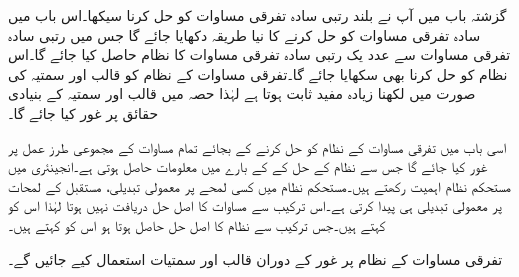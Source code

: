 گزشتہ باب میں آپ نے بلند رتبی سادہ تفرقی مساوات کو حل کرنا سیکھا۔اس باب میں سادہ تفرقی مساوات کو حل کرنے کا نیا طریقہ دکھایا جائے گا جس میں  رتبی سادہ تفرقی مساوات سے  عدد یک رتبی سادہ تفرقی مساوات کا نظام حاصل کیا جائے گا۔اس نظام کو حل کرنا بھی سکھایا جائے گا۔تفرقی مساوات کے نظام کو قالب اور سمتیہ کی صورت میں لکھنا زیادہ مفید ثابت ہوتا ہے لہٰذا حصہ  میں قالب اور سمتیہ کے بنیادی حقائق پر غور کیا جائے گا۔

اسی باب میں تفرقی مساوات کے نظام کو حل کرنے کے بجائے تمام مساوات کے مجموعی طرز عمل پر غور کیا جائے گا جس سے نظام کے حل کے  کے بارے میں معلومات حاصل ہوتی ہے۔انجینئری میں مستحکم نظام  اہمیت رکھتے ہیں۔مستحکم نظام میں کسی لمحے پر معمولی تبدیلی، مستقبل کے لمحات پر معمولی تبدیلی ہی پیدا کرتی ہے۔اس ترکیب سے مساوات کا اصل حل دریافت نہیں ہوتا لہٰذا اس کو  کہتے ہیں۔جس ترکیب سے نظام کا اصل حل حاصل ہوتا ہو اس کو  کہتے ہیں۔

 
تفرقی مساوات کے نظام پر غور کے دوران قالب اور سمتیات استعمال کیے جائیں گے۔

